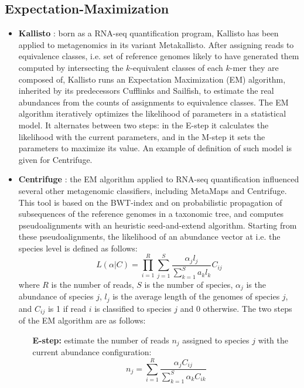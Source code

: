 \subsection{Expectation-Maximization}
\begin{itemize}
    \item \textbf{Kallisto} \cite{bray_near-optimal_2016}: born as a RNA-seq quantification program, Kallisto has been applied to metagenomics in its variant Metakallisto. After assigning reads to equivalence classes, i.e. set of reference genomes likely to have generated them computed by intersecting the $k$-equivalent classes of each $k$-mer they are composed of, Kallisto runs an Expectation Maximization (EM) algorithm, inherited by its predecessors Cufflinks and Sailfish, to estimate the real abundances from the counts of assignments to equivalence classes. The EM algorithm iteratively optimizes the likelihood of parameters in a statistical model. It alternates between two steps: in the E-step it calculates the likelihood with the current parameters, and in the M-step it sets the parameters to maximize its value. An example of definition of such model is given for Centrifuge.
    \item \textbf{Centrifuge} \cite{kim_centrifuge:_2016}: the EM algorithm applied to RNA-seq quantification influenced several other metagenomic classifiers, including MetaMaps \cite{dilthey_metamaps_2018} and Centrifuge. This tool is based on the BWT-index and on probabilistic propagation of subsequences of the reference genomes in a taxonomic tree, and computes pseudoalignments with an heuristic seed-and-extend algorithm. Starting from these pseudoalignments, the likelihood of an abundance vector at i.e. the species level is defined as follows:
    \begin{equation*}
      L(\alpha|C) = \prod_{i=1}^R \sum_{j=1}^S \frac{\alpha_j l_j}{\sum_{k=1}^S a_k l_k} C_{ij}
    \end{equation*}
    where $R$ is the number of reads, $S$ is the number of species, $\alpha_j$ is the abundance of species $j$, $l_j$ is the average length of the genomes of species $j$, and $C_{ij}$ is 1 if read $i$ is classified to species $j$ and 0 otherwise. The two steps of the EM algorithm are as follows:
    \begin{itemize}
      \item[\textbf{E-step:}] estimate the number of reads $n_j$ assigned to species $j$ with the current abundance configuration:
      \begin{equation*}
        n_j = \sum_{i=1}^R \frac{\alpha_j C_{ij}}{\sum_{k=1}^S \alpha_k C_{ik}}

\end{equation*}
\end{itemize}
\end{itemize}

